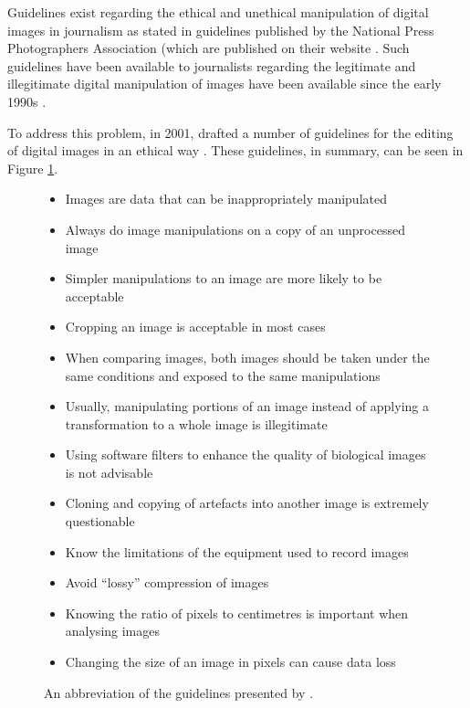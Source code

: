 \documentclass[british,a4paper, 12pt]{article}
\begin{document}
Guidelines exist regarding the ethical and unethical manipulation of digital images in journalism as
stated in guidelines published by the National Press Photographers Association (which are
published on their website \parencite{national2012ethics}. Such guidelines have been available to
journalists regarding the legitimate and illegitimate digital manipulation of images have been
available since the early 1990s \parencite{cromey2010avoiding}.

To address this problem, in 2001, \citeauthor*{cromey2001digital} drafted a number of guidelines for
the editing of digital images in an ethical way \parencite{cromey2001digital}. These guidelines,
in summary, can be seen in Figure \ref{fig:ethicalguidelines}.

\begin{figure}
\label{fig:ethicalguidelines}
\begin{itemize}
\item Images are data that can be inappropriately manipulated
\item Always do image manipulations on a copy of an unprocessed image
\item Simpler manipulations to an image are more likely to be acceptable
\item Cropping an image is acceptable in most cases
\item When comparing images, both images should be taken under the same conditions and exposed to the same manipulations
\item Usually, manipulating portions of an image instead of applying a transformation to a whole image is illegitimate
\item Using software filters to enhance the quality of biological images is not advisable
\item Cloning and copying of artefacts into another image is extremely questionable
\item Know the limitations of the equipment used to record images
\item Avoid ``lossy'' compression of images
\item Knowing the ratio of pixels to centimetres is important when analysing images
\item Changing the size of an image in pixels can cause data loss
\end{itemize}

\caption{An abbreviation of the guidelines presented by \parencite{cromey2001digital}.}
\end{figure}
\end{document}
